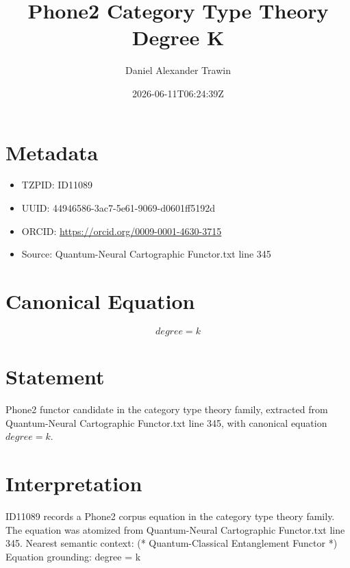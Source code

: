 \documentclass[11pt]{article}
\title{Phone2 Category Type Theory Degree K}
\author{Daniel Alexander Trawin}
\date{2026-06-11T06:24:39Z}
\begin{document}
\maketitle
\section*{Metadata}
\begin{itemize}
\item TZPID: ID11089
\item UUID: 44946586-3ac7-5e61-9069-d0601ff5192d
\item ORCID: \url{https://orcid.org/0009-0001-4630-3715}
\item Source: Quantum-Neural Cartographic Functor.txt line 345
\end{itemize}
\section*{Canonical Equation}
\[
degree = k
\]
\section*{Statement}
Phone2 functor candidate in the category type theory family, extracted from Quantum-Neural Cartographic Functor.txt line 345, with canonical equation $degree = k$.
\section*{Interpretation}
ID11089 records a Phone2 corpus equation in the category type theory family. The equation was atomized from Quantum-Neural Cartographic Functor.txt line 345. Nearest semantic context: (* Quantum-Classical Entanglement Functor *) Equation grounding: degree = k
\end{document}
